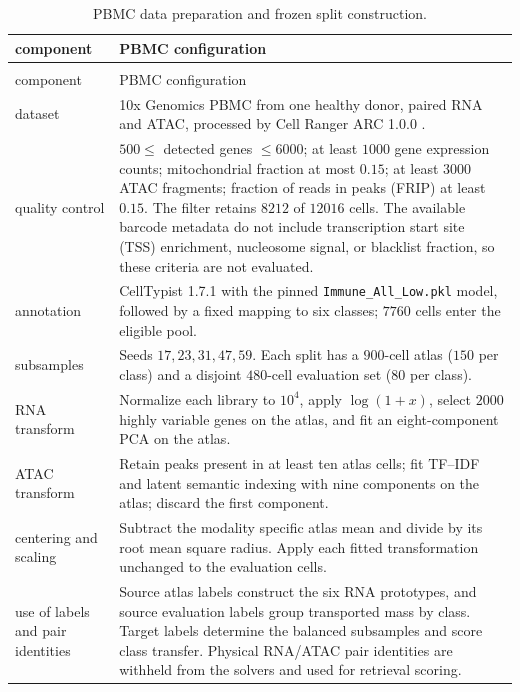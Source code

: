 \documentclass[11pt]{article}
\theoremstyle{plain}
\theoremstyle{definition}
\theoremstyle{remark}
\begin{document}
{\footnotesize
\begin{longtable}{@{}>{\raggedright\arraybackslash}p{}
>{\raggedright\arraybackslash}p{}@{}}
\caption{PBMC data preparation and frozen split construction.}
\label{tab:pbmc-data-config}\\
\toprule
component & PBMC configuration\\
\midrule
\endfirsthead
\multicolumn{2}{@{}l}{\footnotesize\itshape Table~\thetable\ continued}\\
\toprule
component & PBMC configuration\\
\midrule
\endhead
dataset &
10x Genomics PBMC from one healthy donor, paired RNA and ATAC,
processed by Cell Ranger ARC 1.0.0 \cite{TenXPBMC}.\\
quality control &
\(500\le\) detected genes \(\le6000\); at least \(1000\) gene expression
counts; mitochondrial fraction at most \(0.15\); at least \(3000\) ATAC
fragments; fraction of reads in peaks (FRIP) at least \(0.15\). The filter
retains \(8212\) of \(12016\) cells. The available barcode metadata do not
include transcription start site (TSS) enrichment, nucleosome signal, or
blacklist fraction, so these criteria are not evaluated.\\
annotation &
CellTypist 1.7.1 with the pinned \texttt{Immune\_All\_Low.pkl} model,
followed by a fixed mapping to six classes; \(7760\) cells enter the eligible
pool.\\
subsamples &
Seeds \(17,23,31,47,59\). Each split has a \(900\)-cell atlas
(\(150\) per class) and a disjoint \(480\)-cell evaluation set
(\(80\) per class).\\
RNA transform &
Normalize each library to \(10^4\), apply \(\log(1+x)\), select \(2000\)
highly variable genes on the atlas, and fit an eight-component PCA on the
atlas.\\
ATAC transform &
Retain peaks present in at least ten atlas cells; fit TF--IDF and latent
semantic indexing with nine components on the atlas; discard the first
component.\\
centering and scaling &
Subtract the modality specific atlas mean and divide by its root mean square
radius. Apply each fitted transformation unchanged to the evaluation cells.\\
use of labels and pair identities &
Source atlas labels construct the six RNA prototypes, and source evaluation
labels group transported mass by class. Target labels determine the balanced
subsamples and score class transfer. Physical RNA/ATAC pair identities are
withheld from the solvers and used for retrieval scoring.\\
\bottomrule
\end{longtable}
}
\end{document}
